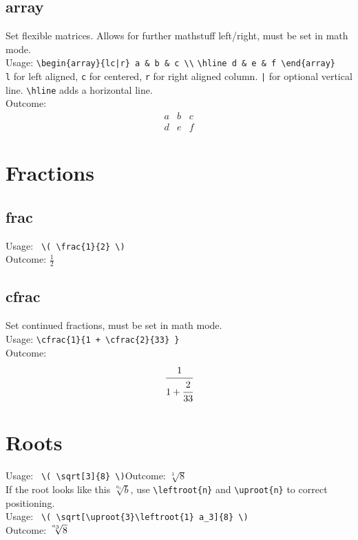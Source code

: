\documentclass[draft]{../cheatsht/cheatsht}
\begin{document}
\subsection{array}
Set flexible matrices. Allows for further mathstuff left/right,
must be set in math mode.\\
Usage: \verb!\begin{array}{lc|r} a & b & c \\!
\verb!\hline d & e & f \end{array}!\\
\verb!l! for left aligned, \verb!c! for centered,
\verb!r! for right aligned column.
\verb!|! for optional vertical line. \verb!\hline! adds a horizontal line.\\
Outcome:
\begin{displaymath}
  \begin{array}{lc|r} a & b & c \\ \hline d & e & f \end{array}
\end{displaymath}

\section{Fractions}
\subsection{frac}
Usage: \verb! \( \frac{1}{2} \)!\\
Outcome: \(\frac{1}{2}\)

\subsection{cfrac}
Set continued fractions, must be set in math mode.\\
Usage: \verb!\cfrac{1}{1 + \cfrac{2}{33} }!\\
Outcome: \begin{displaymath}
  \cfrac{1}{1 + \cfrac{2}{33} }
\end{displaymath}

\section{Roots}
Usage: \verb! \( \sqrt[3]{8} \)!\hspace{1.5cm}Outcome: \(\sqrt[3]{8}\)\\
If the root looks like this \(\sqrt[a_3]{b}\), use \verb!\leftroot{n}! and
\verb!\uproot{n}! to correct positioning.\\
Usage: \verb! \( \sqrt[\uproot{3}\leftroot{1} a_3]{8} \)! \\
Outcome: \(\sqrt[\uproot{3}\leftroot{1} a_3]{8}\)
\end{document}
